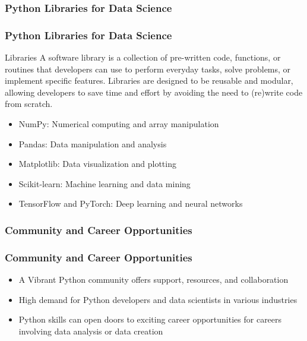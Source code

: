\documentclass{beamer}
\begin{document}
        
    \subsubsection{Python Libraries for Data Science}
    \begin{frame}
        \frametitle{Python Libraries for Data Science}
        \begin{block}{Libraries}
            A software library is a collection of pre-written code, functions, or routines that developers can use to perform everyday tasks, solve problems, or implement specific features. Libraries are designed to be reusable and modular, allowing developers to save time and effort by avoiding the need to (re)write code from scratch.
        \end{block}
        
        \begin{itemize}
            \item NumPy: Numerical computing and array manipulation
            \item Pandas: Data manipulation and analysis
            \item Matplotlib: Data visualization and plotting
            \item Scikit-learn: Machine learning and data mining
            \item TensorFlow and PyTorch: Deep learning and neural networks
        \end{itemize}
    \end{frame}
        
        
    \subsubsection{Community and Career Opportunities}
    \begin{frame}
        \frametitle{Community and Career Opportunities}
        \begin{itemize}
            \item A Vibrant Python community offers support, resources, and collaboration
            \item High demand for Python developers and data scientists in various industries
            \item Python skills can open doors to exciting career opportunities for careers involving data analysis or data creation
        \end{itemize}
    \end{frame}
        
\end{document}
